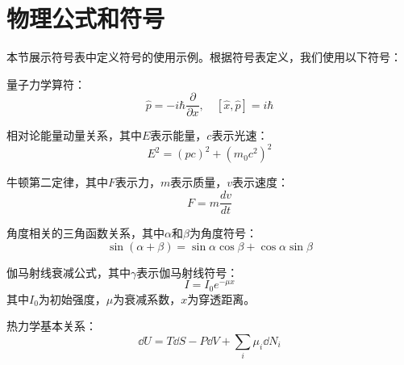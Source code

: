 \section{物理公式和符号}
\label{sec:physics}

本节展示符号表中定义符号的使用示例。根据符号表定义，我们使用以下符号：

量子力学算符：
\begin{equation}
    \hat{p} = -i\hbar \frac{\partial}{\partial x}, \quad
    [\hat{x}, \hat{p}] = i\hbar
\end{equation}

相对论能量动量关系，其中$E$表示能量，$c$表示光速：
\begin{equation}
    E^2 = (pc)^2 + (m_0 c^2)^2
\end{equation}

牛顿第二定律，其中$F$表示力，$m$表示质量，$v$表示速度：
\begin{equation}
    F = m \frac{dv}{dt}
\end{equation}

角度相关的三角函数关系，其中$\alpha$和$\beta$为角度符号：
\begin{equation}
    \sin(\alpha + \beta) = \sin\alpha\cos\beta + \cos\alpha\sin\beta
\end{equation}

伽马射线衰减公式，其中$\gamma$表示伽马射线符号：
\begin{equation}
    I = I_0 e^{-\mu x}
\end{equation}
其中$I_0$为初始强度，$\mu$为衰减系数，$x$为穿透距离。

热力学基本关系：
\begin{equation}
    \dd U = T \dd S - P \dd V + \sum_i \mu_i \dd N_i
\end{equation}

